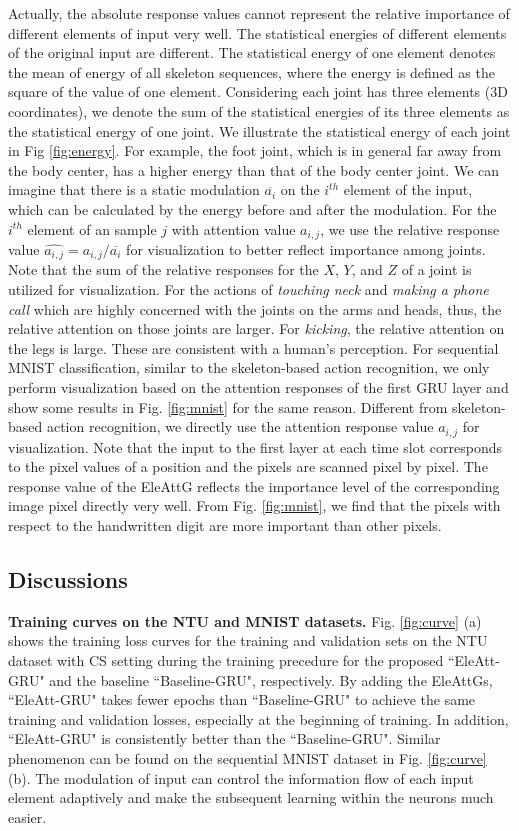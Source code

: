 \documentclass[journal]{IEEEtran}
\newcommand{\EleAttGn}{{EleAttG}}
\begin{document}
Actually, the absolute response values cannot represent the relative importance of different elements of input very well. The statistical energies of different elements of the original input are different. The statistical energy of one element denotes the mean of energy of all skeleton sequences, where the energy is defined as the square of the value of one element. Considering each joint has three elements (3D coordinates), we denote the sum of the statistical energies of its three elements as the statistical energy of one joint. We illustrate the statistical energy of each joint in Fig \ref{fig:energy}. For example, the foot joint, which is in general far away from the body center, has a higher energy than that of the body center joint. We can imagine that there is a static modulation $\overline{a_i}$ on the $i^{th}$ element of the input, which can be calculated by the energy before and after the modulation. For the $i^{th}$ element of an sample $j$ with attention value $a_{i,j}$, we use the relative response value $\widehat{a_{i,j}} = a_{i,j}/\overline{a_i}$ for visualization to better reflect importance among joints. Note that the sum of the relative responses for the $X$, $Y$, and $Z$ of a joint is utilized for visualization. For the actions of \emph{touching neck} and \emph{making a phone call}  which are highly concerned with the joints on the arms and heads, thus, the relative attention on those joints are larger. For \emph{kicking}, the relative attention on the legs is large. These are consistent with a human's perception. 
For sequential MNIST classification, similar to the skeleton-based action recognition, we only perform visualization based on the attention responses of the first GRU layer and show some results in Fig. \ref{fig:mnist} for the same reason. Different from skeleton-based action recognition, we directly use the attention response value $a_{i,j}$ for visualization. Note that the input to the first layer at each time slot corresponds to the pixel values of a position and the pixels are scanned pixel by pixel. The response value of the {\EleAttGn} reflects the importance level of the corresponding image pixel directly very well. From Fig. \ref{fig:mnist}, we find that the pixels with respect to the handwritten digit are more important than other pixels. 

\subsection{Discussions}
\textbf{Training curves on the NTU and MNIST datasets.} Fig. \ref{fig:curve} (a) shows the training loss curves for the training and validation sets on the NTU dataset with CS setting during the training precedure for the proposed ``EleAtt-GRU" and the baseline ``Baseline-GRU", respectively. By adding the {\EleAttGn}s, ``EleAtt-GRU" takes fewer epochs than ``Baseline-GRU" to achieve the same training and validation losses, especially at the beginning of training. In addition, ``EleAtt-GRU" is consistently better than the ``Baseline-GRU". Similar phenomenon can be found on the sequential MNIST dataset in Fig. \ref{fig:curve} (b). The modulation of input can control the information flow of each input element adaptively and make the subsequent learning within the neurons much easier. 
\end{document}
